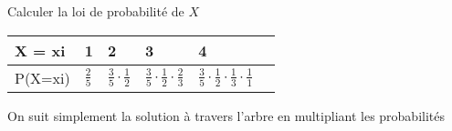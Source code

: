 \begin{exo}
\begin{subexo}{Calculer la loi de probabilité de $X$}
\begin{center}
        \begin{tabular}{p{3cm}|p{2cm}p{2cm}p{2cm}p{2cm}p{2cm}}
          \midrule
          X = xi  & 1   & 2         & 3             & 4                   \\ \toprule
          P(X=xi) & $\frac{2}{5}$    & $\frac{3}{5}\cdot \frac{1}{2}$ & $\frac{3}{5} \cdot \frac{1}{2}  \cdot\frac{2}{3} $& $\frac{3}{5} \cdot \frac{1}{2}  \cdot \frac{1}{3}\cdot \frac{1}{1}$ \\ \midrule
          \end{tabular}
      \end{center}
      On suit simplement la solution à travers l'arbre en multipliant les probabilités
    \end{subexo}
\end{exo}
